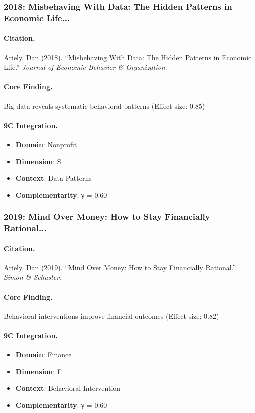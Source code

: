\subsubsection{2018: Misbeha­ving With Data: The Hidden Patterns in Economic Life...}

\paragraph{Citation.}
Ariely, Dan (2018). ``Misbeha­ving With Data: The Hidden Patterns in Economic Life.''
\textit{Journal of Economic Behavior & Organization}.

\paragraph{Core Finding.}
Big data reveals systematic behavioral patterns (Effect size: 0.85)

\paragraph{9C Integration.}
\begin{itemize}[nosep]
  \item \textbf{Domain}: Nonprofit
  \item \textbf{Dimension}: S
  \item \textbf{Context}: Data Patterns
  \item \textbf{Complementarity}: γ = 0.60
\end{itemize}

\subsubsection{2019: Mind Over Money: How to Stay Financially Rational...}

\paragraph{Citation.}
Ariely, Dan (2019). ``Mind Over Money: How to Stay Financially Rational.''
\textit{Simon & Schuster}.

\paragraph{Core Finding.}
Behavioral interventions improve financial outcomes (Effect size: 0.82)

\paragraph{9C Integration.}
\begin{itemize}[nosep]
  \item \textbf{Domain}: Finance
  \item \textbf{Dimension}: F
  \item \textbf{Context}: Behavioral Intervention
  \item \textbf{Complementarity}: γ = 0.60
\end{itemize}

